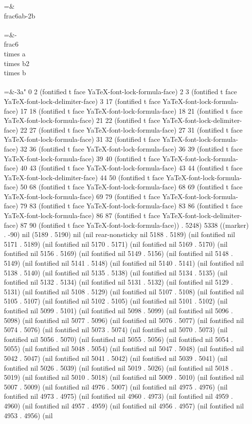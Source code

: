 	 =&\\frac{6ab}{-2b}\\\\
	 =&-\\frac{6\\times a\\times b}{2\\times b}\\\\
	 =&-3a" 0 2 (fontified t face YaTeX-font-lock-formula-face) 2 3 (fontified t face YaTeX-font-lock-delimiter-face) 3 17 (fontified t face YaTeX-font-lock-formula-face) 17 18 (fontified t face YaTeX-font-lock-formula-face) 18 21 (fontified t face YaTeX-font-lock-formula-face) 21 22 (fontified t face YaTeX-font-lock-delimiter-face) 22 27 (fontified t face YaTeX-font-lock-formula-face) 27 31 (fontified t face YaTeX-font-lock-formula-face) 31 32 (fontified t face YaTeX-font-lock-formula-face) 32 36 (fontified t face YaTeX-font-lock-formula-face) 36 39 (fontified t face YaTeX-font-lock-formula-face) 39 40 (fontified t face YaTeX-font-lock-formula-face) 40 43 (fontified t face YaTeX-font-lock-formula-face) 43 44 (fontified t face YaTeX-font-lock-delimiter-face) 44 50 (fontified t face YaTeX-font-lock-formula-face) 50 68 (fontified t face YaTeX-font-lock-formula-face) 68 69 (fontified t face YaTeX-font-lock-formula-face) 69 79 (fontified t face YaTeX-font-lock-formula-face) 79 83 (fontified t face YaTeX-font-lock-formula-face) 83 86 (fontified t face YaTeX-font-lock-formula-face) 86 87 (fontified t face YaTeX-font-lock-delimiter-face) 87 90 (fontified t face YaTeX-font-lock-formula-face)) . 5248) 5338 ((marker) . -90) nil (5189 . 5190) nil (nil rear-nonsticky nil 5188 . 5189) (nil fontified nil 5171 . 5189) (nil fontified nil 5170 . 5171) (nil fontified nil 5169 . 5170) (nil fontified nil 5156 . 5169) (nil fontified nil 5149 . 5156) (nil fontified nil 5148 . 5149) (nil fontified nil 5141 . 5148) (nil fontified nil 5140 . 5141) (nil fontified nil 5138 . 5140) (nil fontified nil 5135 . 5138) (nil fontified nil 5134 . 5135) (nil fontified nil 5132 . 5134) (nil fontified nil 5131 . 5132) (nil fontified nil 5129 . 5131) (nil fontified nil 5108 . 5129) (nil fontified nil 5107 . 5108) (nil fontified nil 5105 . 5107) (nil fontified nil 5102 . 5105) (nil fontified nil 5101 . 5102) (nil fontified nil 5099 . 5101) (nil fontified nil 5098 . 5099) (nil fontified nil 5096 . 5098) (nil fontified nil 5077 . 5096) (nil fontified nil 5076 . 5077) (nil fontified nil 5074 . 5076) (nil fontified nil 5073 . 5074) (nil fontified nil 5070 . 5073) (nil fontified nil 5056 . 5070) (nil fontified nil 5055 . 5056) (nil fontified nil 5054 . 5055) (nil fontified nil 5048 . 5054) (nil fontified nil 5047 . 5048) (nil fontified nil 5042 . 5047) (nil fontified nil 5041 . 5042) (nil fontified nil 5039 . 5041) (nil fontified nil 5026 . 5039) (nil fontified nil 5019 . 5026) (nil fontified nil 5018 . 5019) (nil fontified nil 5010 . 5018) (nil fontified nil 5009 . 5010) (nil fontified nil 5007 . 5009) (nil fontified nil 4976 . 5007) (nil fontified nil 4975 . 4976) (nil fontified nil 4973 . 4975) (nil fontified nil 4960 . 4973) (nil fontified nil 4959 . 4960) (nil fontified nil 4957 . 4959) (nil fontified nil 4956 . 4957) (nil fontified nil 4953 . 4956) (nil 